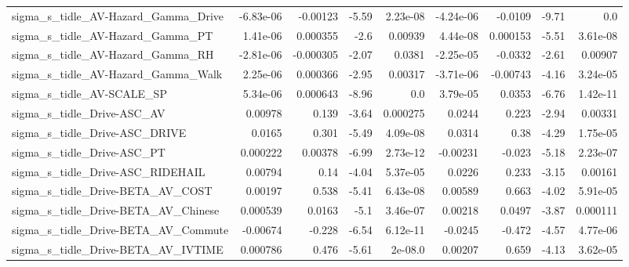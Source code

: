 \begin{tabular}{lrrrrrrrr}
sigma\_s\_tidle\_AV-Hazard\_Gamma\_Drive                &   -6.83e-06 &     -0.00123 &    -5.59 & 2.23e-08 &  -4.24e-06 &     -0.0109 &        -9.71 &           0.0 \\
sigma\_s\_tidle\_AV-Hazard\_Gamma\_PT                   &    1.41e-06 &     0.000355 &     -2.6 &  0.00939 &   4.44e-08 &    0.000153 &        -5.51 &      3.61e-08 \\
sigma\_s\_tidle\_AV-Hazard\_Gamma\_RH                   &   -2.81e-06 &    -0.000305 &    -2.07 &   0.0381 &  -2.25e-05 &     -0.0332 &        -2.61 &       0.00907 \\
sigma\_s\_tidle\_AV-Hazard\_Gamma\_Walk                 &    2.25e-06 &     0.000366 &    -2.95 &  0.00317 &  -3.71e-06 &    -0.00743 &        -4.16 &      3.24e-05 \\
sigma\_s\_tidle\_AV-SCALE\_SP                          &    5.34e-06 &     0.000643 &    -8.96 &      0.0 &   3.79e-05 &      0.0353 &        -6.76 &      1.42e-11 \\
sigma\_s\_tidle\_Drive-ASC\_AV                         &     0.00978 &        0.139 &    -3.64 & 0.000275 &     0.0244 &       0.223 &        -2.94 &       0.00331 \\
sigma\_s\_tidle\_Drive-ASC\_DRIVE                      &      0.0165 &        0.301 &    -5.49 & 4.09e-08 &     0.0314 &        0.38 &        -4.29 &      1.75e-05 \\
sigma\_s\_tidle\_Drive-ASC\_PT                         &    0.000222 &      0.00378 &    -6.99 & 2.73e-12 &   -0.00231 &      -0.023 &        -5.18 &      2.23e-07 \\
sigma\_s\_tidle\_Drive-ASC\_RIDEHAIL                   &     0.00794 &         0.14 &    -4.04 & 5.37e-05 &     0.0226 &       0.233 &        -3.15 &       0.00161 \\
sigma\_s\_tidle\_Drive-BETA\_AV\_COST                   &     0.00197 &        0.538 &    -5.41 & 6.43e-08 &    0.00589 &       0.663 &        -4.02 &      5.91e-05 \\
sigma\_s\_tidle\_Drive-BETA\_AV\_Chinese                &    0.000539 &       0.0163 &     -5.1 & 3.46e-07 &    0.00218 &      0.0497 &        -3.87 &      0.000111 \\
sigma\_s\_tidle\_Drive-BETA\_AV\_Commute                &    -0.00674 &       -0.228 &    -6.54 & 6.12e-11 &    -0.0245 &      -0.472 &        -4.57 &      4.77e-06 \\
sigma\_s\_tidle\_Drive-BETA\_AV\_IVTIME                 &    0.000786 &        0.476 &    -5.61 &  2e-08.0 &    0.00207 &       0.659 &        -4.13 &      3.62e-05 \\

\end{tabular}
